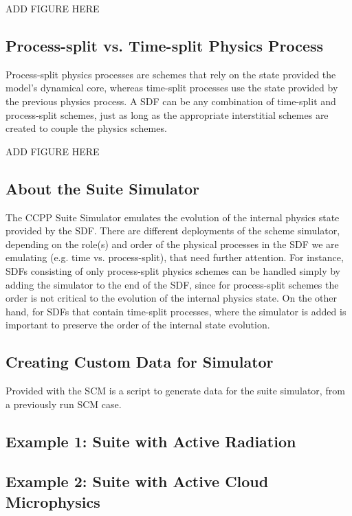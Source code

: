 ADD FIGURE HERE

\subsection{Process-split vs. Time-split Physics Process}

Process-split physics processes are schemes that rely on the state provided the model's dynamical core, whereas time-split processes use the state provided by the previous physics process. A SDF can be any combination of time-split and process-split schemes, just as long as the appropriate interstitial schemes are created to couple the physics schemes.

ADD FIGURE HERE

\subsection{About the Suite Simulator}

The CCPP Suite Simulator emulates the evolution of the internal physics state provided by the SDF. There are different deployments of the scheme simulator, depending on the role(s) and order of the physical processes in the SDF we are emulating (e.g. time vs. process-split), that need further attention. For instance, SDFs consisting of only process-split physics schemes can be handled simply by adding the simulator to the end of the SDF, since for process-split schemes the order is not critical to the evolution of the internal physics state. On the other hand, for SDFs that contain time-split processes, where the simulator is added is important to preserve the order of the internal state evolution.

\subsection{Creating Custom Data for Simulator}

Provided with the SCM is a script to generate data for the suite simulator, from a previously run SCM case.

\subsection{Example 1: Suite with Active Radiation}

\subsection{Example 2: Suite with Active Cloud Microphysics }
